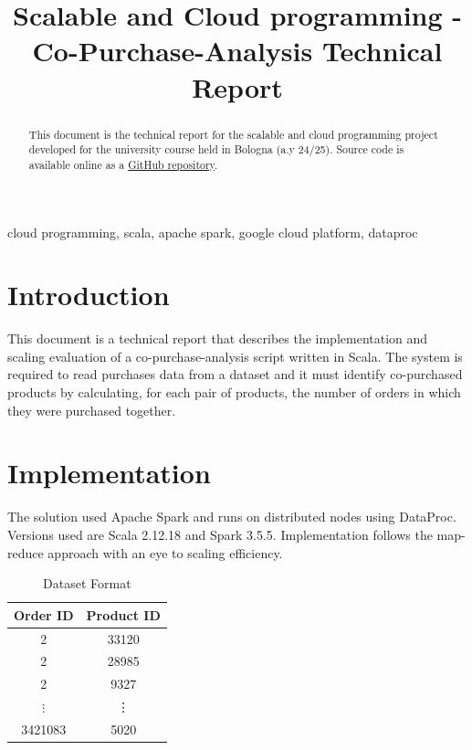 \documentclass[conference]{IEEEtran}
\begin{document}
\title{Scalable and Cloud programming - Co-Purchase-Analysis Technical Report}

\author{
}

\maketitle

\begin{abstract}
This document is the technical report for the scalable and cloud programming project developed for the university course held in Bologna (a.y 24/25). Source code is available online as a \href{https://github.com/micheledinelli/scalable-cloud-programming}{GitHub repository}.
\end{abstract}

\begin{IEEEkeywords}
cloud programming, scala, apache spark, google cloud platform, dataproc
\end{IEEEkeywords}

\section{Introduction}
This document is a technical report that describes the implementation and scaling evaluation of a co-purchase-analysis script written in Scala. The system is required to read purchases data from a dataset \cite{dataset} and it must identify co-purchased products by calculating, for each pair of products, the number of orders in which they were purchased together.

\section{Implementation}
The solution used Apache Spark \cite{10.1145/2934664} and runs on distributed nodes using DataProc. Versions used are Scala 2.12.18 and Spark 3.5.5. Implementation follows the map-reduce approach with an eye to scaling efficiency.

\begin{table}[htbp]
\caption{Dataset Format}
\begin{center}
\begin{tabular}{|c|c|}
\hline
\textbf{Order ID}& \textbf{Product ID}\\
\hline
2& 33120 \\
\hline
2&28985 \\ 
\hline
2& 9327 \\
\hline
$\vdots$& \vdots \\
\hline
3421083& 5020 \\
\hline
\end{tabular}
\label{tab:dataset}
\end{center}
\end{table}
\end{document}
